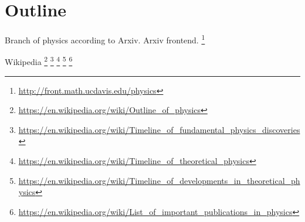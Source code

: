 \chapter{Outline}

Branch of physics according to Arxiv.
Arxiv frontend.%
\footnote{\url{http://front.math.ucdavis.edu/physics}}

Wikipedia%
\footnote{\url{https://en.wikipedia.org/wiki/Outline_of_physics}}%
\footnote{\url{https://en.wikipedia.org/wiki/Timeline_of_fundamental_physics_discoveries}}%
\footnote{\url{https://en.wikipedia.org/wiki/Timeline_of_theoretical_physics}}%
\footnote{\url{https://en.wikipedia.org/wiki/Timeline_of_developments_in_theoretical_physics}}%
\footnote{\url{https://en.wikipedia.org/wiki/List_of_important_publications_in_physics}}
